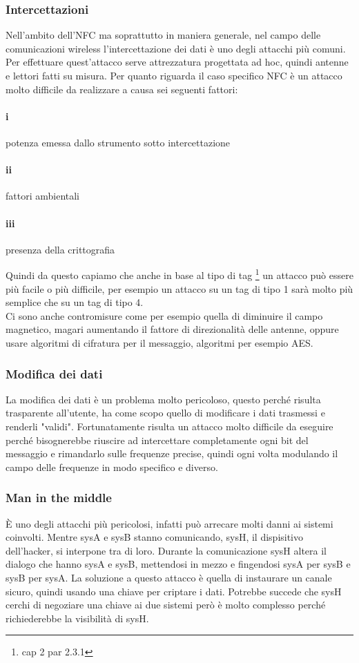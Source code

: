 \subsubsection{Intercettazioni}
\hspace{\parindent}Nell'ambito dell'NFC ma soprattutto in maniera generale, nel campo delle comunicazioni wireless l'intercettazione dei dati è uno degli attacchi più comuni. Per effettuare quest'attacco serve attrezzatura progettata ad hoc, quindi antenne e lettori fatti su misura. Per quanto riguarda il caso specifico NFC è un attacco molto difficile da realizzare a causa sei seguenti fattori:
\paragraph{i} potenza emessa dallo strumento sotto intercettazione
\paragraph{ii} fattori ambientali
\paragraph{iii} presenza della crittografia

Quindi da questo capiamo che anche in base al tipo di tag \footnote{cap 2 par 2.3.1} un attacco può essere più facile o più difficile, per esempio un attacco su un tag di tipo 1 sarà molto più semplice che su un tag di tipo 4.
\\Ci sono anche contromisure come per esempio quella di diminuire il campo magnetico, magari aumentando il fattore di direzionalità delle antenne, oppure usare algoritmi di cifratura per il messaggio, algoritmi per esempio AES.
\subsubsection{Modifica dei dati}
\hspace{\parindent}La modifica dei dati è un problema molto pericoloso, questo perché risulta trasparente all'utente, ha come scopo quello di modificare i dati trasmessi e renderli "validi". Fortunatamente risulta un attacco molto difficile da eseguire perché bisognerebbe riuscire ad intercettare completamente ogni bit del messaggio e rimandarlo sulle frequenze precise, quindi ogni volta modulando il campo delle frequenze in modo specifico e diverso.
\subsubsection{Man in the middle}
\hspace{\parindent}È uno degli attacchi più pericolosi, infatti può arrecare molti danni ai sistemi coinvolti. Mentre sysA e sysB stanno comunicando, sysH, il dispisitivo dell'hacker, si interpone tra di loro. Durante la comunicazione sysH altera il dialogo che hanno sysA e sysB, mettendosi in mezzo e fingendosi sysA per sysB e sysB per sysA. La soluzione a questo attacco è quella di instaurare un canale sicuro, quindi usando una chiave per criptare i dati. 
Potrebbe succede che sysH cerchi di negoziare una chiave ai due sistemi però è molto complesso perché richiederebbe la visibilità di sysH.

